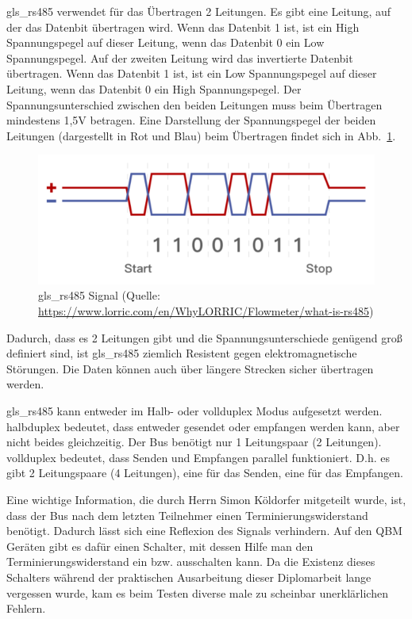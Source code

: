 \gls{gls_rs485} verwendet für das Übertragen 2 Leitungen. Es gibt eine Leitung, auf der das Datenbit übertragen wird. Wenn das Datenbit 1 ist, ist ein High Spannungspegel auf dieser Leitung, wenn das Datenbit 0 ein Low Spannungspegel. Auf der zweiten Leitung wird das invertierte Datenbit übertragen. Wenn das Datenbit 1 ist, ist ein Low Spannungspegel auf dieser Leitung, wenn das Datenbit 0 ein High Spannungspegel. Der Spannungsunterschied zwischen den beiden Leitungen muss beim Übertragen mindestens 1,5V betragen. \cite[vgl.][]{Kugelstadt:2021}
Eine Darstellung der Spannungspegel der beiden Leitungen (dargestellt in Rot und Blau) beim Übertragen findet sich in Abb.~\ref{fig:rs485_signal}.
\begin{figure}[H]
	\centering
	\includegraphics[width=0.5\linewidth]{Bilder/RS485_signal_illustration}
	\caption{\gls{gls_rs485} Signal (Quelle: \url{https://www.lorric.com/en/WhyLORRIC/Flowmeter/what-is-rs485})}
	\label{fig:rs485_signal}
\end{figure}

Dadurch, dass es 2 Leitungen gibt und die Spannungsunterschiede genügend groß definiert sind, ist \gls{gls_rs485} ziemlich Resistent gegen elektromagnetische Störungen. Die Daten können auch über längere Strecken sicher übertragen werden. \cite[vgl.][]{Kugelstadt:2021, Heinen_Elektronik_GmbH:o.J.}

\gls{gls_rs485} kann entweder im Halb- oder \gls{vollduplex} Modus aufgesetzt werden. \newline \gls{halbduplex} bedeutet, dass entweder gesendet oder empfangen werden kann, aber nicht beides gleichzeitig. Der Bus benötigt nur 1 Leitungspaar (2 Leitungen). \newline \gls{vollduplex} bedeutet, dass Senden und Empfangen parallel funktioniert. D.h. es gibt 2 Leitungspaare (4 Leitungen), eine für das Senden, eine für das Empfangen. \cite[vgl.][]{Kugelstadt:2021} 

Eine wichtige Information, die durch Herrn Simon Köldorfer mitgeteilt wurde, ist, dass der Bus nach dem letzten Teilnehmer einen Terminierungswiderstand benötigt. Dadurch lässt sich eine Reflexion des Signals verhindern. \cite[vgl.][]{Kugelstadt:2021} Auf den QBM Geräten gibt es dafür einen Schalter, mit dessen Hilfe man den Terminierungswiderstand ein bzw. ausschalten kann. Da die Existenz dieses Schalters während der praktischen Ausarbeitung dieser Diplomarbeit lange vergessen wurde, kam es beim Testen diverse male zu scheinbar unerklärlichen Fehlern.

